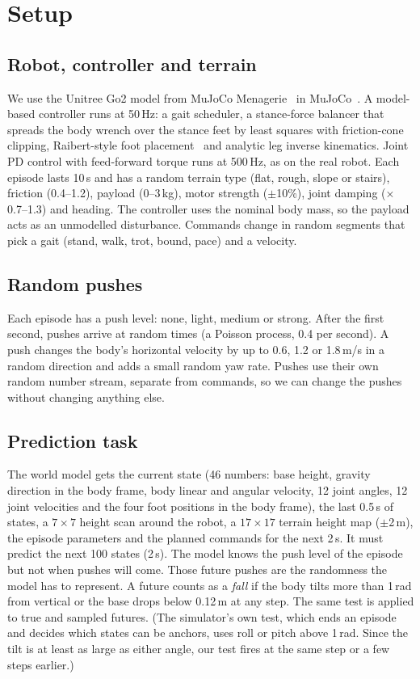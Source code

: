 \documentclass[conference]{IEEEtran}
\begin{document}
\section{Setup}

\subsection{Robot, controller and terrain}
We use the Unitree Go2 model from MuJoCo Menagerie~\cite{zakka2022menagerie} in
MuJoCo~\cite{todorov2012mujoco}. A model-based controller runs at 50\,Hz: a gait scheduler,
a stance-force balancer that spreads the body wrench over the stance feet by least
squares with friction-cone clipping, Raibert-style foot placement~\cite{raibert1986} and
analytic leg inverse kinematics. Joint PD control with feed-forward torque runs at
500\,Hz, as on the real robot. Each episode lasts 10\,s and has a random terrain type
(flat, rough, slope or stairs), friction (0.4--1.2), payload (0--3\,kg), motor strength
($\pm$10\%), joint damping ($\times$0.7--1.3) and heading. The controller uses the nominal
body mass, so the payload acts as an unmodelled disturbance. Commands change in random
segments that pick a gait (stand, walk, trot, bound, pace) and a velocity.

\subsection{Random pushes}
Each episode has a push level: none, light, medium or strong. After the first second,
pushes arrive at random times (a Poisson process, 0.4 per second). A push changes the
body's horizontal velocity by up to 0.6, 1.2 or 1.8\,m/s in a random direction and adds a
small random yaw rate. Pushes use their own random number stream, separate from commands,
so we can change the pushes without changing anything else.

\subsection{Prediction task}
The world model gets the current state (46 numbers: base height, gravity direction in the
body frame, body linear and angular velocity, 12 joint angles, 12 joint velocities and the
four foot positions in the body frame), the last 0.5\,s of states, a $7\times7$ height scan
around the robot, a $17\times17$ terrain height map ($\pm$2\,m), the episode parameters and
the planned commands for the next 2\,s. It must predict the next 100 states (2\,s). The
model knows the push level of the episode but not when pushes will come. Those future
pushes are the randomness the model has to represent. A future counts as a \emph{fall} if
the body tilts more than 1\,rad from vertical or the base drops below 0.12\,m at any step.
The same test is applied to true and sampled futures. (The simulator's own test, which ends
an episode and decides which states can be anchors, uses roll or pitch above 1\,rad. Since
the tilt is at least as large as either angle, our test fires at the same step or a few
steps earlier.)
\end{document}
